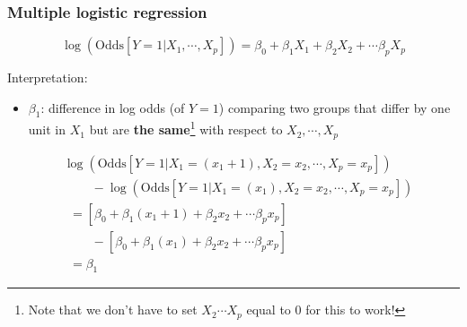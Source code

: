 \documentclass[12pt, 
hyperref={colorlinks=true, linkcolor=blue, urlcolor=cyan}]{beamer}
\begin{document}
\begin{frame}
\frametitle{Multiple logistic regression}
$$\log\left(\text{Odds}[Y =1 |X_1,\cdots,X_p]\right) = \beta_0 + \beta_1 X_1 + \beta_2X_2 + \cdots \beta_p X_p$$

\color{blue} Interpretation: \color{black}
\begin{itemize}  \color{orange}
\item $\beta_1$: difference in log odds (of $Y=1$) comparing two groups that differ by one unit in $X_1$ but are \textbf{the same}\footnote[frame]{Note that we don't have to set $X_2 \cdots X_p$ equal to 0 for this to work!} with respect to $X_2,\cdots,X_p$ \pause
\end{itemize}
\vspace{-0.3cm}
\begin{scriptsize}
\begin{align*}
& \log\left(\text{Odds}[Y =1 |X_1=(x_1+1),X_2=x_2,\cdots,X_p=x_p]\right) \\
& \ \ \ \ \ \ \ \ \ \ - \log\left(\text{Odds}[Y =1 |X_1=(x_1),X_2=x_2,\cdots,X_p=x_p]\right) \\
& \ \ = \left[\beta_0 + \beta_1(x_1+1) + \beta_2 x_2 + \cdots \beta_p x_p\right]\\
& \ \ \ \ \ \ \ \ \ \ - \left[\beta_0 + \beta_1(x_1) + \beta_2 x_2 + \cdots \beta_p x_p\right] \\
& \ \ = \beta_1
\end{align*}
\end{scriptsize}

\end{frame}
\end{document}
